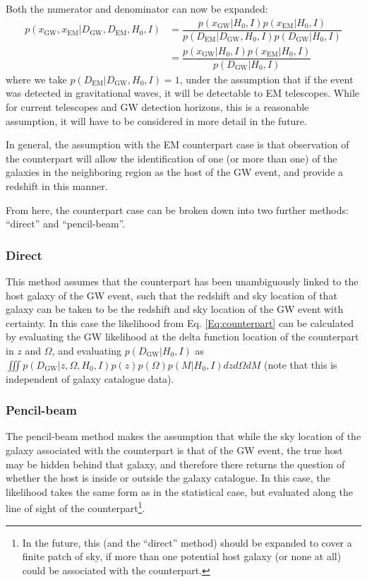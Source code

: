 \documentclass[a4paper,10pt]{article}
\begin{document}
Both the numerator and denominator can now be expanded:
\begin{equation} \label{Eq:counterpart}
\begin{aligned}
p(x_{\text{GW}},x_{\text{EM}}|D_{\text{GW}},D_{\text{EM}},H_0,I) &= \dfrac{p(x_{\text{GW}}|H_0,I) p(x_{\text{EM}}|H_0,I)}{p(D_{\text{EM}}|D_{\text{GW}},H_0,I) p(D_{\text{GW}}|H_0,I)} 
\\ &= \dfrac{p(x_{\text{GW}}|H_0,I) p(x_{\text{EM}}|H_0,I)}{p(D_{\text{GW}}|H_0,I)} 
\end{aligned} 
\end{equation}
where we take $p(D_{\text{EM}}|D_{\text{GW}},H_0,I) = 1$, under the assumption that if the event was detected in gravitational waves, it will be detectable to EM telescopes.  While for current telescopes and GW detection horizons, this is a reasonable assumption, it will have to be considered in more detail in the future.

In general, the assumption with the EM counterpart case is that observation of the counterpart will allow the identification of one (or more than one) of the galaxies in the neighboring region as the host of the GW event, and provide a redshift in this manner.

From here, the counterpart case can be broken down into two further methods: ``direct'' and ``pencil-beam''. 

\subsubsection{Direct}
This method assumes that the counterpart has been unambiguously linked to the host galaxy of the GW event, such that the redshift and sky location of that galaxy can be taken to be the redshift and sky location of the GW event with certainty.  In this case the likelihood from Eq. \ref{Eq:counterpart} can be calculated by evaluating the GW likelihood at the delta function location of the counterpart in $z$ and $\Omega$, and evaluating $p(D_{\text{GW}}|H_0,I)$ as $\iiint p(D_{\text{GW}}|z,\Omega,H_0,I) p(z)p(\Omega)p(M|H_0,I) dz d\Omega dM$ (note that this is independent of galaxy catalogue data).



\subsubsection{Pencil-beam}
The pencil-beam method makes the assumption that while the sky location of the galaxy associated with the counterpart is that of the GW event, the true host may be hidden behind that galaxy, and therefore there returns the question of whether the host is inside or outside the galaxy catalogue.  In this case, the likelihood takes the same form as in the statistical case, but evaluated along the line of sight of the counterpart\footnote{In the future, this (and the ``direct'' method) should be expanded to cover a finite patch of sky, if more than one potential host galaxy (or none at all) could be associated with the counterpart.}.
\end{document}
